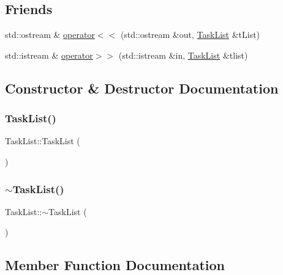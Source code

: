 \subsection*{Friends}
\begin{DoxyCompactItemize}
\item 
std\+::ostream \& \mbox{\hyperlink{class_task_list_ac872aa1fde53a5f9336c1cc4d96bc733}{operator$<$$<$}} (std\+::ostream \&out, \mbox{\hyperlink{class_task_list}{Task\+List}} \&t\+List)
\item 
std\+::istream \& \mbox{\hyperlink{class_task_list_a22dacdc7ddbda65560de5195bd0fad24}{operator$>$$>$}} (std\+::istream \&in, \mbox{\hyperlink{class_task_list}{Task\+List}} \&tlist)
\end{DoxyCompactItemize}


\subsection{Constructor \& Destructor Documentation}
\mbox{\label{class_task_list_aa98ab27bfb922941bfa9d08704f41a3d}} 
\subsubsection{\texorpdfstring{Task\+List()}{TaskList()}}
{\footnotesize\ttfamily Task\+List\+::\+Task\+List (\begin{DoxyParamCaption}{ }\end{DoxyParamCaption})}

\mbox{\label{class_task_list_a62532b7a52881d389f94ea891e38eeb8}} 
\subsubsection{\texorpdfstring{$\sim$\+Task\+List()}{~TaskList()}}
{\footnotesize\ttfamily Task\+List\+::$\sim$\+Task\+List (\begin{DoxyParamCaption}{ }\end{DoxyParamCaption})}



\subsection{Member Function Documentation}
\mbox{\label{class_task_list_a1f1547ccbb7037a1b00505284241d6f6}} 
